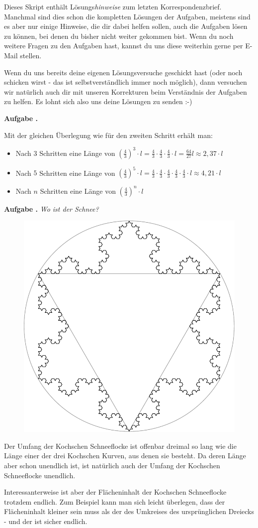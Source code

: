 \documentclass[a4paper,ngerman,12pt]{scrartcl}
\theoremstyle{definition}
\theoremstyle{plain}
\theoremstyle{remark}
\newlength{\aufgabenskip}
\newcounter{aufgabennummer}
\newenvironment{aufgabe}[1]{
  \addtocounter{aufgabennummer}{1}
  \textbf{Aufgabe \theaufgabennummer.} \emph{#1} \par
}{\vspace{\aufgabenskip}}
\begin{document}
Dieses Skript enthält Lösungs\emph{hinweise} zum letzten Korrespondenzbrief. Manchmal sind dies schon die kompletten Lösungen der Aufgaben, meistens sind es aber nur einige Hinweise, die dir dabei helfen sollen, auch die Aufgaben lösen zu können, bei denen du bisher nicht weiter gekommen bist. Wenn du noch weitere Fragen zu den Aufgaben hast, kannst du uns diese weiterhin gerne per E-Mail stellen.

Wenn du uns bereits deine eigenen Lösungsversuche geschickt hast (oder noch schicken wirst - das ist selbstverständlich immer noch möglich), dann versuchen wir natürlich auch dir mit unseren Korrekturen beim Verständnis der Aufgaben zu helfen. Es lohnt sich also uns deine Lösungen zu senden :-)

\begin{aufgabe}{}
	Mit der gleichen Überlegung wie für den zweiten Schritt erhält man:
	\begin{itemize}
		\item Nach $3$ Schritten eine Länge von $\left(\frac{4}{3}\right)^3\cdot l = \frac{4}{3}\cdot\frac{4}{3}\cdot\frac{4}{3}\cdot l = \frac{64}{27}l \approx 2,37 \cdot l$
		\item Nach $5$ Schritten eine Länge von $\left(\frac{4}{3}\right)^5\cdot l = \frac{4}{3}\cdot\frac{4}{3}\cdot\frac{4}{3}\cdot\frac{4}{3}\cdot\frac{4}{3}\cdot l  \approx 4,21 \cdot l$
		\item Nach $n$ Schritten eine Länge von $\left(\frac{4}{3}\right)^n\cdot l$
	\end{itemize}
\end{aufgabe}

\begin{aufgabe}{Wo ist der Schnee?}
	\begin{figure}\vspace{-1cm}
		\includegraphics[width=.4\textwidth]{Bilder/Schneeflocke-Umkreis.pdf}
	\end{figure}

Der Umfang der Kochschen Schneeflocke ist offenbar dreimal so lang wie die Länge einer der drei Kochschen Kurven, aus denen sie besteht. Da deren Länge aber schon unendlich ist, ist natürlich auch der Umfang der Kochschen Schneeflocke unendlich.

Interessanterweise ist aber der Flächeninhalt der Kochschen Schneeflocke trotzdem endlich. Zum Beispiel kann man sich leicht überlegen, dass der Flächeninhalt kleiner sein muss als der des Umkreises des ursprünglichen Dreiecks - und der ist sicher endlich.

\end{aufgabe}
\end{document}

